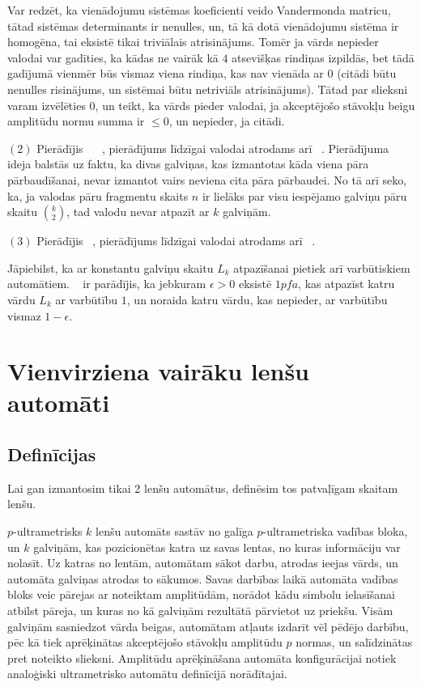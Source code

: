 \documentclass{ludis}
\begin{document}
\begin{pieradijums}
Var redzēt, ka vienādojumu sistēmas koeficienti veido Vandermonda matricu, tātad sistēmas determinants ir nenulles, un, tā kā dotā vienādojumu sistēma ir homogēna, tai eksistē tikai triviālais atrisinājums. Tomēr ja vārds nepieder valodai var gadīties, ka kādas ne vairāk kā $4$ atsevišķas rindiņas izpildās, bet tādā gadījumā vienmēr būs vismaz viena rindiņa, kas nav vienāda ar 0 (citādi būtu nenulles risinājums, un sistēmai būtu netriviāls atrisinājums). Tātad par slieksni varam izvēlēties 0, un teikt, ka vārds pieder valodai, ja akceptējošo stāvokļu beigu amplitūdu normu summa ir $\leq 0$, un nepieder, ja citādi.

$(2)$ Pierādījis ~\citet{Freivalds1982} ~\citep{Freivalds1979}, pierādījums līdzīgai valodai atrodams arī ~\citep{Yao1978}. Pierādījuma ideja balstās uz faktu, ka divas galviņas, kas izmantotas kāda viena pāra pārbaudīšanai, nevar izmantot vairs neviena cita pāra pārbaudei. No tā arī seko, ka, ja valodas pāru fragmentu skaits $n$ ir lielāks par visu iespējamo galviņu pāru skaitu ${k\choose 2}$, tad valodu nevar atpazīt ar $k$ galviņām.

$(3)$ Pierādījis ~\citet{Freivalds1982}, pierādījums līdzīgai valodai atrodams arī ~\citep{Yao1978}.
\end{pieradijums}

Jāpiebilst, ka ar konstantu galviņu skaitu $L_k$ atpazīšanai pietiek arī varbūtiskiem automātiem. ~\citet{Freivalds1982} ir parādījis, ka jebkuram $\epsilon > 0$ eksistē $1pfa$, kas atpazīst katru vārdu $L_k$ ar varbūtību $1$, un noraida katru vārdu, kas nepieder, ar varbūtību vismaz $1 - \epsilon$.

\chapter{Vienvirziena vairāku lenšu automāti}
\section{Definīcijas}
Lai gan izmantosim tikai 2 lenšu automātus, definēsim tos patvaļīgam skaitam lenšu.
\begin{definicija}
$p$-ultrametrisks $k$ lenšu automāts sastāv no galīga $p$-ultrametriska vadības bloka, un $k$ galviņām, kas pozicionētas katra uz savas lentas, no kuras informāciju var nolasīt. Uz katras no lentām, automātam sākot darbu, atrodas ieejas vārds, un automāta galviņas atrodas to sākumos. Savas darbības laikā automāta vadības bloks veic pārejas ar noteiktam amplitūdām, norādot kādu simbolu ielasīšanai atbilst pāreja, un kuras no kā galviņām rezultātā pārvietot uz priekšu. Visām galviņām sasniedzot vārda beigas, automātam atļauts izdarīt vēl pēdējo darbību, pēc kā tiek aprēķinātas akceptējošo stāvokļu amplitūdu $p$ normas, un salīdzinātas pret noteikto slieksni. Amplitūdu aprēķināšana automāta konfigurācijai notiek analoģiski ultrametrisko automātu definīcijā norādītajai.
\end{definicija}
\end{document}
